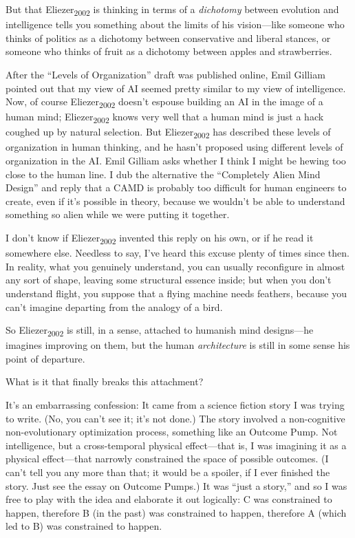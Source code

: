 {
 But that Eliezer\textsubscript{2002} is thinking in terms of a
\textit{dichotomy} between evolution and intelligence tells you
something about the limits of his vision---like someone who thinks of
politics as a dichotomy between conservative and liberal stances, or
someone who thinks of fruit as a dichotomy between apples and
strawberries.}

{
 After the ``Levels of
Organization'' draft was published online, Emil
Gilliam pointed out that my view of AI seemed pretty similar to my view
of intelligence. Now, of course Eliezer\textsubscript{2002}
doesn't espouse building an AI in the image of a human
mind; Eliezer\textsubscript{2002} knows very well that a human mind is
just a hack coughed up by natural selection. But
Eliezer\textsubscript{2002} has described these levels of organization
in human thinking, and he hasn't proposed using
different levels of organization in the AI. Emil Gilliam asks whether I
think I might be hewing too close to the human line. I dub the
alternative the ``Completely Alien Mind
Design'' and reply that a CAMD is probably too
difficult for human engineers to create, even if it's
possible in theory, because we wouldn't be able to
understand something so alien while we were putting it together.}

{
 I don't know if Eliezer\textsubscript{2002}
invented this reply on his own, or if he read it somewhere else.
Needless to say, I've heard this excuse plenty of times
since then. In reality, what you genuinely understand, you can usually
reconfigure in almost any sort of shape, leaving some structural
essence inside; but when you don't understand flight,
you suppose that a flying machine needs feathers, because you
can't imagine departing from the analogy of a bird.}

{
 So Eliezer\textsubscript{2002} is still, in a sense, attached to
humanish mind designs---he imagines improving on them, but the human
\textit{architecture} is still in some sense his point of departure.}

{
 What is it that finally breaks this attachment?}

{
 It's an embarrassing confession: It came from a
science fiction story I was trying to write. (No, you
can't see it; it's not done.) The story
involved a non-cognitive non-evolutionary optimization process,
something like an Outcome Pump. Not intelligence, but a cross-temporal
physical effect---that is, I was imagining it as a physical
effect---that narrowly constrained the space of possible outcomes. (I
can't tell you any more than that; it would be a
spoiler, if I ever finished the story. Just see the essay on Outcome
Pumps.) It was ``just a story,'' and
so I was free to play with the idea and elaborate it out logically: C
was constrained to happen, therefore B (in the past) was constrained to
happen, therefore A (which led to B) was constrained to happen.}

